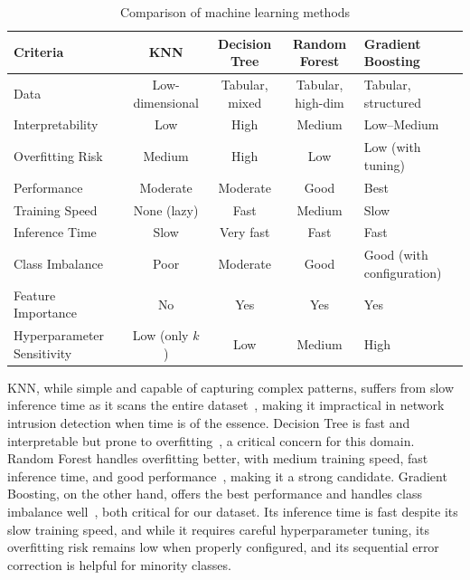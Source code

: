 \begin{table}[H]
    \centering
    \caption{Comparison of machine learning methods}
    \label{tab:ml_comparison}
    \small
    \renewcommand{\arraystretch}{1.2}
    \begin{tabular}{|p{2.8cm}|c|c|c|p{2.5cm}|}
        \hline
        \rowcolor[gray]{0.8}\textbf{Criteria} & \textbf{KNN}    & \textbf{Decision Tree} & \textbf{Random Forest} & \textbf{Gradient Boosting} \\
        \hline
        Data                                  & Low-dimensional & Tabular, mixed         & Tabular, high-dim      & Tabular, structured        \\
        \hline
        Interpretability                      & Low             & High                   & Medium                 & Low--Medium                \\
        \hline
        Overfitting Risk                      & Medium          & High                   & Low                    & Low (with tuning)          \\
        \hline
        Performance                           & Moderate        & Moderate               & Good                   & Best                       \\
        \hline
        Training Speed                        & None (lazy)     & Fast                   & Medium                 & Slow                       \\
        \hline
        Inference Time                        & Slow            & Very fast              & Fast                   & Fast                       \\
        \hline
        Class Imbalance                       & Poor            & Moderate               & Good                   & Good (with configuration)  \\
        \hline
        Feature Importance                    & No              & Yes                    & Yes                    & Yes                        \\
        \hline
        Hyperparameter Sensitivity            & Low (only $k$)  & Low                    & Medium                 & High                       \\
        \hline
    \end{tabular}
\end{table}

KNN, while simple and capable of capturing complex patterns, suffers from slow inference time as it scans the entire dataset~\cite{KNN}, making it impractical in network intrusion detection when time is of the essence. Decision Tree is fast and interpretable but prone to overfitting~\cite{DT}, a critical concern for this domain. Random Forest handles overfitting better, with medium training speed, fast inference time, and good performance~\cite{RF}, making it a strong candidate. Gradient Boosting, on the other hand, offers the best performance and handles class imbalance well~\cite{GB}, both critical for our dataset. Its inference time is fast despite its slow training speed, and while it requires careful hyperparameter tuning, its overfitting risk remains low when properly configured, and its sequential error correction is helpful for minority classes.

